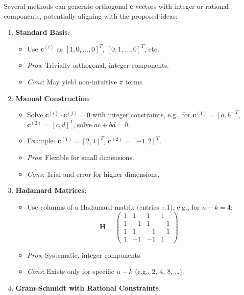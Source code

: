 \documentclass[
	11pt, %
	fleqn, %
	a4paper, %
]{LegrandOrangeBook}
\begin{document}
Several methods can generate orthogonal $\mathbf{c}$ vectors with integer or rational components, potentially aligning with the proposed ideas:
\begin{enumerate}
    \item \textbf{Standard Basis}:
        \begin{itemize}
            \item Use $\mathbf{c}^{(i)}$ as $[1, 0, \ldots, 0]^T$, $[0, 1, \ldots, 0]^T$, etc.
            \item \textit{Pros}: Trivially orthogonal, integer components.
            \item \textit{Cons}: May yield non-intuitive $\pi$ terms.
        \end{itemize}
    \item \textbf{Manual Construction}:
        \begin{itemize}
            \item Solve $\mathbf{c}^{(i)} \cdot \mathbf{c}^{(j)} = 0$ with integer constraints, e.g., for $\mathbf{c}^{(1)} = [a, b]^T$, $\mathbf{c}^{(2)} = [c, d]^T$, solve $a c + b d = 0$.
            \item Example: $\mathbf{c}^{(1)} = [2, 1]^T$, $\mathbf{c}^{(2)} = [-1, 2]^T$.
            \item \textit{Pros}: Flexible for small dimensions.
            \item \textit{Cons}: Trial and error for higher dimensions.
        \end{itemize}
    \item \textbf{Hadamard Matrices}:
        \begin{itemize}
            \item Use columns of a Hadamard matrix (entries $\pm 1$), e.g., for $n - k = 4$:
            \[
            \mathbf{H} = \begin{pmatrix}
                1 & 1 & 1 & 1 \\
                1 & -1 & 1 & -1 \\
                1 & 1 & -1 & -1 \\
                1 & -1 & -1 & 1
            \end{pmatrix}
            \]
            \item \textit{Pros}: Systematic, integer components.
            \item \textit{Cons}: Exists only for specific $n - k$ (e.g., 2, 4, 8, \ldots).
        \end{itemize}
    \item \textbf{Gram-Schmidt with Rational Constraints}:

\end{enumerate}
\end{document}
